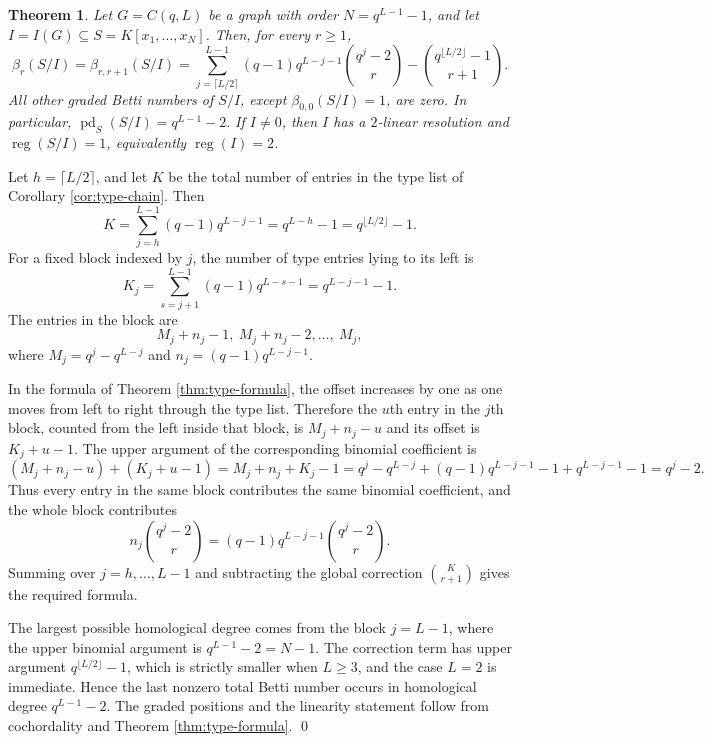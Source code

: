 \documentclass[12pt]{article}
\newtheorem{theorem}{Theorem}[section]
\theoremstyle{definition}
\renewenvironment{proof}{{\bf \noindent Proof.}}{\qed}
\begin{document}
\begin{theorem}\label{thm:chain-betti}
	Let $G=C(q,L)$ be a graph with order $N=q^{L-1}-1$, and let $I=I(G)\subseteq S=K[x_1,\ldots,x_N]$.  Then, for every $r\geq 1$,
	$$
	\beta_r(S/I)=\beta_{r,r+1}(S/I)=
	\sum_{j=\lceil L/2\rceil}^{L-1}(q-1)q^{L-j-1}\binom{q^j-2}{r}
	-\binom{q^{\lfloor L/2\rfloor}-1}{r+1}.
	$$
	All other graded Betti numbers of $S/I$, except $\beta_{0,0}(S/I)=1$, are zero.  In particular,
	$ \operatorname{pd}_S(S/I)=q^{L-1}-2.$
	If $I\neq 0$, then $I$ has a $2$-linear resolution and $\operatorname{reg}(S/I)=1$, equivalently $\operatorname{reg}(I)=2$.
\end{theorem}

\begin{proof}
	Let $h=\lceil L/2\rceil$, and let $K$ be the total number of entries in the type list of Corollary \ref{cor:type-chain}.  Then
	$$
	K=\sum_{j=h}^{L-1}(q-1)q^{L-j-1}=q^{L-h}-1=q^{\lfloor L/2\rfloor}-1.
	$$
	For a fixed block indexed by $j$, the number of type entries lying to its left is
	$$
	K_j=\sum_{s=j+1}^{L-1}(q-1)q^{L-s-1}=q^{L-j-1}-1.
	$$
	The entries in the block are
	$$
	M_j+n_j-1,\ M_j+n_j-2,\ldots,\ M_j,
	$$
	where $M_j=q^j-q^{L-j}$ and $n_j=(q-1)q^{L-j-1}$.
	
	\medskip
	
	In the  formula of Theorem \ref{thm:type-formula}, the offset increases by one as one moves from left to right through the type list.  Therefore the $u$th entry in the $j$th block, counted from the left inside that block, is
	$ M_j+n_j-u $ 	and its offset is $K_j+u-1$.  The upper argument of the corresponding binomial coefficient is
	$$
	(M_j+n_j-u)+(K_j+u-1)=M_j+n_j+K_j-1=q^j-q^{L-j}+(q-1)q^{L-j-1}-1+q^{L-j-1}-1=q^j-2.
	$$
	Thus every entry in the same block contributes the same binomial coefficient, and the whole block contributes
	$$
	n_j\binom{q^j-2}{r}=(q-1)q^{L-j-1}\binom{q^j-2}{r}.
	$$
	Summing over $j=h,\ldots,L-1$ and subtracting the global correction $\binom K{r+1}$ gives the required formula.
	
	\medskip
	
	The largest possible homological degree comes from the block $j=L-1$, where the upper binomial argument is $q^{L-1}-2=N-1$.  The correction term has upper argument $q^{\lfloor L/2\rfloor}-1$, which is strictly smaller when $L\geq 3$, and the case $L=2$ is immediate.  Hence the last nonzero total Betti number occurs in homological degree $q^{L-1}-2$.  The graded positions and the linearity statement follow from cochordality and Theorem \ref{thm:type-formula}.
\end{proof}
\end{document}
